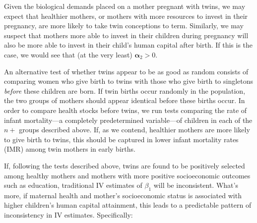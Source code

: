 Given the biological demands placed on a mother pregnant with twins, we may 
expect that healthier mothers, or mothers with more resources to invest in their
pregnancy, are more likely to take twin conceptions to term.  Similarly, we may
suspect that mothers more able to invest in their children during pregnancy will 
also be more able to invest in their child's human capital after birth.  If this 
is the case, we would see that (at the very least) $\bm{\alpha}_2>0$.  

An alternative test of whether twins appear to be as good as random consists of 
comparing women who give birth to twins with those who give birth to singletons 
\emph{before} these children are born.  If twin births occur randomly in the 
population, the two groups of mothers should appear identical before these births 
occur. In order to compare health stocks before twins, we run tests comparing the 
rate of infant mortality---a completely predetermined variable---of children in 
each of the $n+$ groups described above.  If, as we contend, healthier mothers 
are more likely to give birth to twins, this should be captured in lower infant 
mortality rates (IMR) among twin mothers in early births.

If, following the tests described above, twins are found to be positively selected
among healthy mothers and mothers with more positive socioeconomic outcomes such
as education, traditional IV estimates of $\beta_1$ will be inconsistent. What's 
more, if maternal health and mother's socioeconomic status is associated with 
higher children's human capital attainment, this leads to a predictable pattern
of inconsistency in IV estimates.  Specifically:

